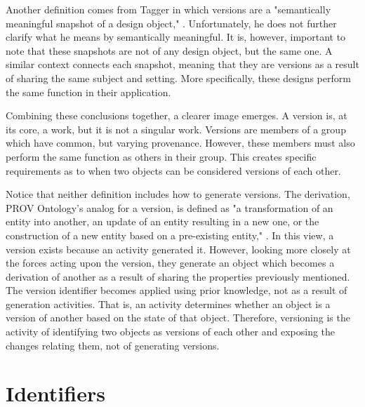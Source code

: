 Another definition comes from Tagger in which versions are a "semantically meaningful snapshot of a design object," \cite{Tagger2005}.
Unfortunately, he does not further clarify what he means by semantically meaningful.
It is, however, important to note that these snapshots are not of any design object, but the same one.
A similar context connects each snapshot, meaning that they are versions as a result of sharing the same subject and setting.
More specifically, these designs perform the same function in their application.

Combining these conclusions together, a clearer image emerges.
A version is, at its core, a work, but it is not a singular work.
Versions are members of a group which have common, but varying provenance.
However, these members must also perform the same function as others in their group.
This creates specific requirements as to when two objects can be considered versions of each other.

Notice that neither definition includes how to generate versions.
The derivation, PROV Ontology's analog for a version, is defined as "a transformation of an entity into another, an update of an entity resulting in a new one, or the construction of a new entity based on a pre-existing entity," \cite{Lebo2013}.
In this view, a version exists because an activity generated it.
However, looking more closely at the forces acting upon the version, they generate an object which becomes a derivation of another as a result of sharing the properties previously mentioned.
The version identifier becomes applied using prior knowledge, not as a result of generation activities.
That is, an activity determines whether an object is a version of another based on the state of that object.
Therefore, versioning is the activity of identifying two objects as versions of each other and exposing the changes relating them, not of generating versions.

\section{Identifiers}

